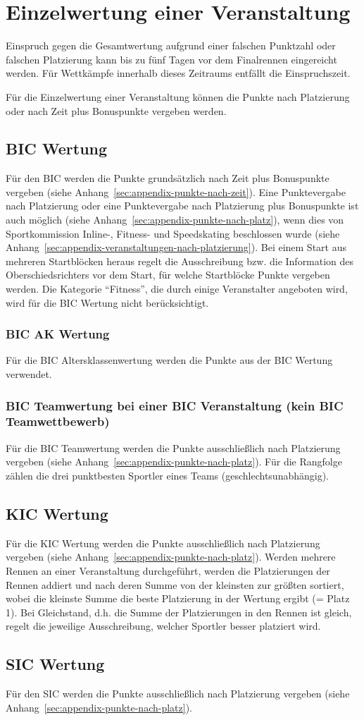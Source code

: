 \section{Einzelwertung einer Veranstaltung}
Einspruch gegen die Gesamtwertung aufgrund einer falschen Punktzahl oder falschen Platzierung kann bis zu fünf Tagen vor dem Finalrennen eingereicht werden. Für Wettkämpfe innerhalb dieses Zeitraums entfällt die Einspruchszeit.

Für die Einzelwertung einer Veranstaltung können die Punkte nach Platzierung oder nach Zeit plus Bonuspunkte vergeben werden.

\subsection{BIC Wertung}
Für den BIC werden die Punkte grundsätzlich nach Zeit plus Bonuspunkte vergeben (siehe Anhang~\ref{sec:appendix-punkte-nach-zeit}). Eine Punktevergabe nach Platzierung oder eine Punktevergabe nach Platzierung plus Bonuspunkte ist auch möglich (siehe Anhang~\ref{sec:appendix-punkte-nach-platz}), wenn dies von Sportkommission Inline-, Fitness- und Speedskating beschlossen wurde (siehe Anhang~\ref{sec:appendix-veranstaltungen-nach-platzierung}). Bei einem Start aus mehreren Startblöcken heraus regelt die Ausschreibung bzw. die Information des Oberschiedsrichters vor dem Start, für welche Startblöcke Punkte vergeben werden. Die Kategorie “Fitness”, die durch einige Veranstalter angeboten wird, wird für die BIC Wertung nicht berücksichtigt.

\subsubsection{BIC AK Wertung}
Für die BIC Altersklassenwertung werden die Punkte aus der BIC Wertung verwendet.

\subsubsection{BIC Teamwertung bei einer BIC Veranstaltung (kein BIC Teamwettbewerb)}
Für die BIC Teamwertung werden die Punkte ausschließlich nach Platzierung vergeben (siehe Anhang~\ref{sec:appendix-punkte-nach-platz}). Für die Rangfolge zählen die drei punktbesten Sportler eines Teams (geschlechtsunabhängig).

\subsection{KIC Wertung}
Für die KIC Wertung werden die Punkte ausschließlich nach Platzierung vergeben (siehe Anhang~\ref{sec:appendix-punkte-nach-platz}). Werden mehrere Rennen an einer Veranstaltung durchgeführt, werden die Platzierungen der Rennen addiert und nach deren Summe von der kleinsten zur größten sortiert, wobei die kleinste Summe die beste Platzierung in der Wertung ergibt (= Platz 1). Bei Gleichstand, d.h. die Summe der Platzierungen in den Rennen ist gleich, regelt die jeweilige Ausschreibung, welcher Sportler besser platziert wird.

\subsection{SIC Wertung}
Für den SIC werden die Punkte ausschließlich nach Platzierung vergeben (siehe Anhang~\ref{sec:appendix-punkte-nach-platz}).